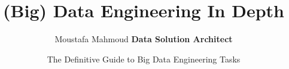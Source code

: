\title[Data Engineering In Depth] %
{(Big) Data Engineering In Depth}



\author[Moustafa Mahmoud] {
	Moustafa Mahmoud \newline 	
	\footnotesize \textcolor{ballblue}{\textbf{Data Solution Architect}} \newline
}

\date[\today] %
{The Definitive Guide to Big Data Engineering Tasks}



